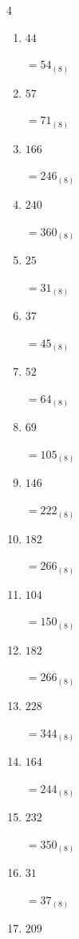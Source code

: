 \begin{multicols}{4}
\begin{enumerate}
  \item $44$

        $=54_{(8)}$

  \item $57$

        $=71_{(8)}$

  \item $166$

        $=246_{(8)}$

\columnbreak %

  \item $240$

        $=360_{(8)}$

  \item $25$

        $=31_{(8)}$

  \item $37$

        $=45_{(8)}$

  \item $52$

        $=64_{(8)}$

  \item $69$

        $=105_{(8)}$

  \item $146$

        $=222_{(8)}$

  \item $182$

        $=266_{(8)}$

  \item $104$

        $=150_{(8)}$

  \item $182$

        $=266_{(8)}$

  \item $228$

        $=344_{(8)}$

  \item $164$

        $=244_{(8)}$

  \item $232$

        $=350_{(8)}$

  \item $31$

        $=37_{(8)}$

  \item $209$


\end{enumerate}
\end{multicols}

